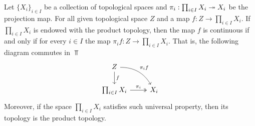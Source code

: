 \begin{theorem}
  \label{thm: prod top universal prop}
  Let \(\{X_i\}_{i \in I}\) be a collection of topological spaces and \(\pi_i:
  \prod_{i \in I} X_i \twoheadrightarrow  X_i\) be the projection map. For all given
  topological space \(Z\) and a map \(f: Z \to \prod_{i \in I} X_i\). If
  \(\prod_{i \in I} X_i\) is endowed with the product topology, then the map
  \(f\) is continuous if and only if for every \(i \in I\) the map \(\pi_i
  f: Z \to \prod_{i \in I} X_i\). That is, the following diagram commutes in
  \(\Top\)
  \[
    \begin{tikzcd}
      Z \ar[d, "f"] \ar[dr, bend left, "\pi_i  f"] \\
      \prod_{i \in I} X_i \ar[r, two heads, "\pi_i"] &X_i
    \end{tikzcd}
  \]
  Moreover, if the space \(\prod_{i \in I} X_i\) satisfies such universal
  property, then its topology is the product topology.
\end{theorem}

